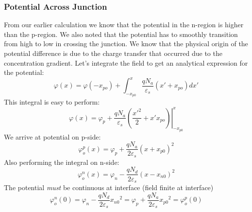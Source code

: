 \subsubsection{Potential Across Junction}
From our earlier calculation we know that the potential in the n-region is higher than the  p-region.  We also noted that the potential has to smoothly transition from high to low in crossing the junction.   We know that the physical origin of the potential difference is due to the charge transfer that occurred due to the concentration gradient.   Let's integrate the field to get an analytical expression for the potential:
    \begin{equation}
        \varphi (x) = \varphi ( - {x_{po}}) + \int_{ - {x_{p0}}}^x {\frac{{q{N_a}}}{{{\varepsilon _s}}}(x' + {x_{po}})dx'} 
    \end{equation}
This integral is easy to perform:
    \begin{equation} 
        \varphi (x) = {\varphi _p} + \left. {\frac{{q{N_a}}}{{{\varepsilon _s}}}\left( {\frac{{x{'^2}}}{2} + x'{x_{po}}} \right)} \right|_{ - {x_{p0}}}^x 
    \end{equation}
We arrive at potential on p-side:
    \begin{equation}
        \varphi _o^p(x) = {\varphi _p} + \frac{{q{N_a}}}{{2{\varepsilon _s}}}{(x + {x_{p0}})^2} 
    \end{equation}
Also performing the integral on n-side:
    \begin{equation}
        \varphi _o^n(x) = {\varphi _n} - \frac{{q{N_d}}}{{2{\varepsilon _s}}}{(x - {x_{n0}})^2} 
    \end{equation}
The potential \textit{must} be continuous at interface (field finite at interface)
    \begin{equation}
        \varphi _o^n(0) = {\varphi _n} - \frac{{q{N_d}}}{{2{\varepsilon _s}}}{{x_{n0}}^2} = {\varphi _p} + \frac{{q{N_a}}}{{2{\varepsilon _s}}}{{x_{p0}}^2} = \varphi _o^p(0)
    \end{equation}
